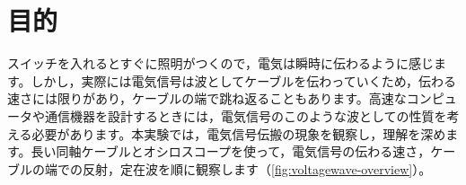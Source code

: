 \graphicspath{{contents/05_voltagewave/figures/}}


\section{目的}

スイッチを入れるとすぐに照明がつくので，電気は瞬時に伝わるように感じます。しかし，実際には電気信号は波としてケーブルを伝わっていくため，伝わる速さには限りがあり，ケーブルの端で跳ね返ることもあります。高速なコンピュータや通信機器を設計するときには，電気信号のこのような波としての性質を考える必要があります。本実験では，電気信号伝搬の現象を観察し，理解を深めます。長い同軸ケーブルとオシロスコープを使って，電気信号の伝わる速さ，ケーブルの端での反射，定在波を順に観察します（\cref{fig:voltagewave-overview}）。

